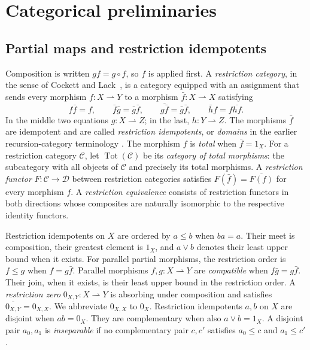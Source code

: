 \section{Categorical preliminaries}\label{sec:preliminaries}

\subsection{Partial maps and restriction idempotents}

Composition is written $gf=g\circ f$, so $f$ is applied first.
A \emph{restriction category}, in the sense of Cockett and
Lack~\cite[Section~2.1.1]{CockettLack}, is a category equipped with an assignment
that sends every morphism
$f:X\rightharpoonup Y$ to a morphism
$\bar f:X\rightharpoonup X$ satisfying
\[
 f\bar f=f,\qquad
 \bar f\bar g=\bar g\bar f,\qquad
 \overline{g\bar f}=\bar g\bar f,\qquad
 \bar h f=f\overline{hf}.
\]
In the middle two equations $g:X\rightharpoonup Z$; in the last,
$h:Y\rightharpoonup Z$.
The morphisms $\bar f$ are idempotent and are called
\emph{restriction idempotents}, or \emph{domains} in the earlier
recursion-category terminology \cite[Section~5]{Heller}.
The morphism $f$ is \emph{total} when $\bar f=1_X$.
For a restriction category $\mathcal C$, let
$\operatorname{Tot}(\mathcal C)$ be its \emph{category of total morphisms}:
the subcategory with all objects of $\mathcal C$ and precisely its
total morphisms.
A \emph{restriction functor} $F:\mathcal C\to\mathcal D$ between
restriction categories satisfies $F(\bar f)=\overline{F(f)}$ for every
morphism $f$. A \emph{restriction equivalence} consists of restriction
functors in both directions whose composites are naturally isomorphic
to the respective identity functors.

Restriction idempotents on $X$ are ordered by $a\le b$ when $ba=a$.
Their meet is composition, their greatest element is $1_X$, and
$a\vee b$ denotes their least upper bound when it exists.
For parallel partial morphisms, the restriction order is
$f\le g$ when $f=g\bar f$.
Parallel morphisms $f,g:X\rightharpoonup Y$ are \emph{compatible} when
$f\bar g=g\bar f$. Their join, when it exists, is their least upper
bound in the restriction order.
A \emph{restriction zero} $0_{X,Y}:X\rightharpoonup Y$ is
absorbing under composition and satisfies
$\overline{0_{X,Y}}=0_{X,X}$. We abbreviate $0_{X,X}$ to $0_X$.
Restriction idempotents $a,b$ on $X$ are disjoint when $ab=0_X$.
They are complementary when also $a\vee b=1_X$.
A disjoint pair $a_0,a_1$ is \emph{inseparable} if no complementary
pair $c,c'$ satisfies $a_0\le c$ and $a_1\le c'$.

